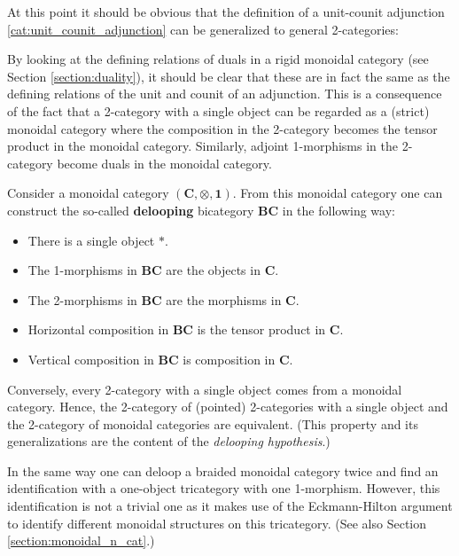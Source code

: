     At this point it should be obvious that the definition of a unit-counit adjunction \ref{cat:unit_counit_adjunction} can be generalized to general 2-categories:
    \begin{remark}
        By looking at the defining relations of duals in a rigid monoidal category (see Section \ref{section:duality}), it should be clear that these are in fact the same as the defining relations of the unit and counit of an adjunction. This is a consequence of the fact that a 2-category with a single object can be regarded as a (strict) monoidal category where the composition in the 2-category becomes the tensor product in the monoidal category. Similarly, adjoint 1-morphisms in the 2-category become duals in the monoidal category.
    \end{remark}

    \begin{property}\label{cat:monoidal_or_2}
        Consider a monoidal category $(\mathbf{C},\otimes,\mathbf{1})$. From this monoidal category one can construct the so-called \textbf{delooping} bicategory $\mathbf{BC}$ in the following way:
        \begin{itemize}
            \item There is a single object $\ast$.
            \item The 1-morphisms in $\mathbf{BC}$ are the objects in $\mathbf{C}$.
            \item The 2-morphisms in $\mathbf{BC}$ are the morphisms in $\mathbf{C}$.
            \item Horizontal composition in $\mathbf{BC}$ is the tensor product in $\mathbf{C}$.
            \item Vertical composition in $\mathbf{BC}$ is composition in $\mathbf{C}$.
        \end{itemize}
        Conversely, every 2-category with a single object comes from a monoidal category. Hence, the 2-category of (pointed) 2-categories with a single object and the 2-category of monoidal categories are equivalent. (This property and its generalizations are the content of the \textit{delooping hypothesis}.)

        In the same way one can deloop a braided monoidal category twice and find an identification with a one-object tricategory with one 1-morphism. However, this identification is not a trivial one as it makes use of the Eckmann-Hilton argument to identify different monoidal structures on this tricategory. (See also Section \ref{section:monoidal_n_cat}.)
    \end{property}

